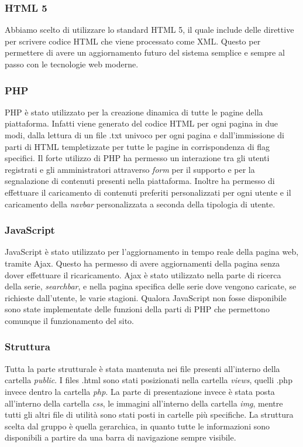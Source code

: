 \subsubsection{HTML 5}
Abbiamo scelto di utilizzare lo standard HTML 5, il quale include delle direttive per scrivere codice HTML che viene processato come XML. Questo per permettere di avere un aggiornamento futuro del sistema  semplice e sempre al passo con le tecnologie web moderne.

\subsubsection{PHP}
PHP è stato utilizzato per la creazione dinamica di tutte le pagine della piattaforma. Infatti viene generato del codice HTML per ogni pagina in due modi, dalla lettura di un file .txt univoco per ogni pagina e dall'immissione di parti di HTML templetizzate per tutte le pagine in corrispondenza di flag specifici. Il forte utilizzo di PHP ha permesso un interazione tra gli utenti registrati e gli amministratori attraverso \textit{form} per il supporto e per la segnalazione di contenuti presenti nella piattaforma. Inoltre ha permesso di effettuare il caricamento di contenuti preferiti personalizzati per ogni utente e il caricamento della \textit{navbar} personalizzata a seconda della tipologia di utente. 

\subsubsection{JavaScript}
JavaScript è stato utilizzato per l'aggiornamento in tempo reale della pagina web, tramite Ajax. Questo ha permesso di avere aggiornamenti della pagina senza dover effettuare il ricaricamento. Ajax è stato utilizzato nella parte di ricerca della serie, \textit{searchbar}, e nella pagina specifica delle serie dove vengono caricate, se richieste dall'utente, le varie stagioni. Qualora JavaScript non fosse disponibile sono state implementate delle funzioni della parti di PHP che permettono comunque il funzionamento del sito.

\subsubsection{Struttura}
Tutta la parte strutturale è stata mantenuta nei file presenti all'interno della cartella \textit{public}. I files .html sono stati posizionati nella cartella \textit{views}, quelli .php invece dentro la cartella \textit{php}. La parte di presentazione invece è stata posta all'interno della cartella \textit{css}, le immagini all'interno della cartella \textit{img}, mentre tutti gli altri file di utilità sono stati posti in cartelle più specifiche. La struttura scelta dal gruppo è quella gerarchica, in quanto tutte le informazioni sono disponibili a partire da una barra di navigazione sempre visibile.

